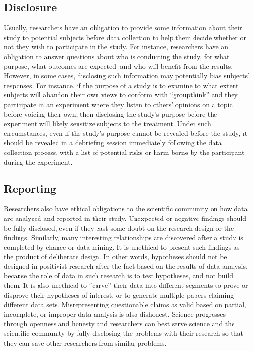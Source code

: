 \subsection{Disclosure}

Usually, researchers have an obligation to provide some information about their study to potential subjects before data collection to help them decide whether or not they wish to participate in the study. For instance, researchers have an obligation to answer questions about who is conducting the study, for what purpose, what outcomes are expected, and who will benefit from the results. However, in some cases, disclosing such information may potentially bias subjects' responses. For instance, if the purpose of a study is to examine to what extent subjects will abandon their own views to conform with ``groupthink'' and they participate in an experiment where they listen to others' opinions on a topic before voicing their own, then disclosing the study's purpose before the experiment will likely sensitize subjects to the treatment. Under such circumstances, even if the study's purpose cannot be revealed before the study, it should be revealed in a debriefing session immediately following the data collection process, with a list of potential risks or harm borne by the participant during the experiment.


\subsection{Reporting}

Researchers also have ethical obligations to the scientific community on how data are analyzed and reported in their study. Unexpected or negative findings should be fully disclosed, even if they cast some doubt on the research design or the findings. Similarly, many interesting relationships are discovered after a study is completed by chance or data mining. It is unethical to present such findings as the product of deliberate design. In other words, hypotheses should not be designed in positivist research after the fact based on the results of data analysis, because the role of data in such research is to test hypotheses, and not build them. It is also unethical to ``carve'' their data into different segments to prove or disprove their hypotheses of interest, or to generate multiple papers claiming different data sets. Misrepresenting questionable claims as valid based on partial, incomplete, or improper data analysis is also dishonest. Science progresses through openness and honesty and researchers can best serve science and the scientific community by fully disclosing the problems with their research so that they can save other researchers from similar problems.

